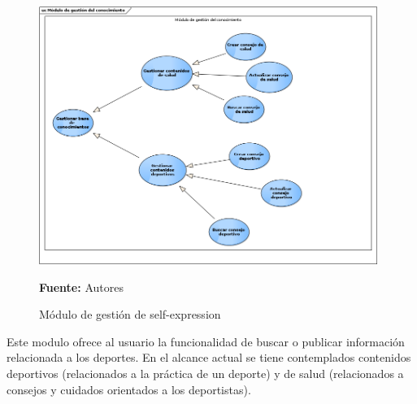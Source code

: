 \begin{figure}[!htb]
  \begin{center}
    \includegraphics[width=11cm]{./imagenes/casos_uso/gestion_conocimiento.png}
    \caption{Módulo de gestión de self-expression}
    \label{fig:cu_self_shar}
    \textbf{Fuente:} Autores
  \end{center}
\end{figure}

Este modulo ofrece al usuario la funcionalidad de buscar o publicar información relacionada a los deportes. En el alcance actual se tiene contemplados contenidos deportivos (relacionados a la práctica de un deporte) y de salud (relacionados a consejos y cuidados orientados a los deportistas).